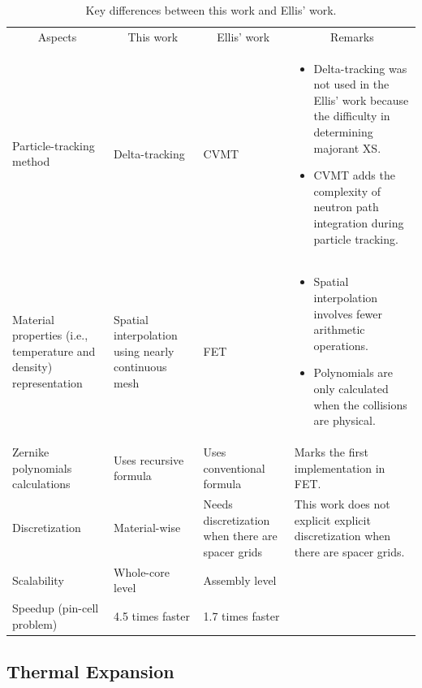 \begin{table}
    \centering
    \setlength{\leftmargini}{0.2cm}
    \caption{Key differences between this work and Ellis' work.}
    \label{tab_1q} 
    \begin{tabular}{| m{2.75cm} | m{2.75cm} | m{2.75cm} | m{6cm} | }
        \hline
        \multicolumn{1}{|c|}{Aspects} & \multicolumn{1}{c|}{This work} & \multicolumn{1}{c|}{Ellis' work} & \multicolumn{1}{c|}{Remarks} \\
        \hhline{|=|=|=|=|}
        Particle-tracking method & Delta-tracking & CVMT & 
        \begin{itemize} 
            \item Delta-tracking was not used in the Ellis' work because the difficulty in determining majorant XS.
            \item CVMT adds the complexity of neutron path integration during particle tracking.
        \end{itemize} \\
        \hline
        Material properties (i.e., temperature and density) representation & Spatial interpolation using nearly continuous mesh & FET & 
        \begin{itemize} 
            \item Spatial interpolation involves fewer arithmetic operations.
            \item Polynomials are only calculated when the collisions are physical.
        \end{itemize} \\
        \hline
        Zernike polynomials calculations & Uses recursive formula & Uses conventional formula & Marks the first implementation in FET. \\ \hline
        Discretization & Material-wise & Needs discretization when there are spacer grids & This work does not explicit explicit discretization when there are spacer grids. \\ \hline
        Scalability & Whole-core level & Assembly level &  \\ \hline
        Speedup (pin-cell problem) & 4.5 times faster & 1.7 times faster &  \\ \hline
    \end{tabular}
\end{table}

\subsection{Thermal Expansion} \label{sec12}

